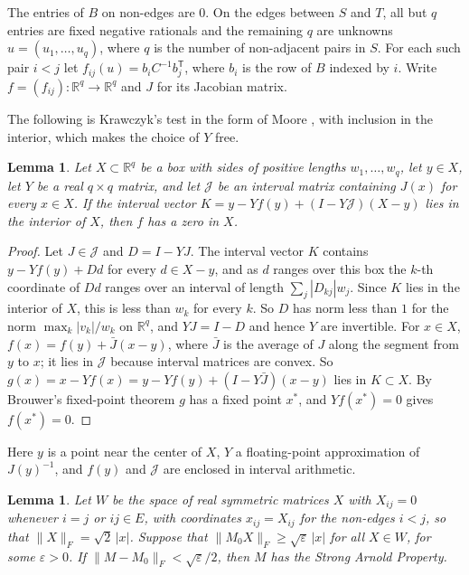 \documentclass[11pt]{article}
\newtheorem{lemma}[theorem]{Lemma}
\theoremstyle{remark}
\begin{document}
The entries of $B$ on non-edges are $0$. On the edges between $S$ and
$T$, all but $q$ entries are fixed negative rationals and the remaining
$q$ are unknowns $u=(u_1,\dots,u_q)$, where $q$ is the number of
non-adjacent pairs in $S$. For each such pair $i<j$ let
$f_{ij}(u)=b_iC^{-1}b_j^{\mathsf T}$, where $b_i$ is the row of $B$
indexed by $i$. Write $f=(f_{ij})\colon\mathbb{R}^q\to\mathbb{R}^q$ and
$J$ for its Jacobian matrix.

The following is Krawczyk's test \cite{Kr} in the form of Moore
\cite{Mo}, with inclusion in the interior, which makes the choice of $Y$
free.

\begin{lemma}\label{lem:krawczyk}
Let $X\subset\mathbb{R}^q$ be a box with sides of positive lengths
$w_1,\dots,w_q$, let $y\in X$, let $Y$ be a real $q\times q$ matrix, and
let $\mathcal{J}$ be an interval matrix containing $J(x)$ for every $x\in
X$. If the interval vector $K=y-Yf(y)+(I-Y\mathcal{J})(X-y)$ lies in the
interior of $X$, then $f$ has a zero in $X$.
\end{lemma}

\begin{proof}
Let $J\in\mathcal{J}$ and $D=I-YJ$. The interval vector $K$ contains
$y-Yf(y)+Dd$ for every $d\in X-y$, and as $d$ ranges over this box the
$k$-th coordinate of $Dd$ ranges over an interval of length
$\sum_j|D_{kj}|w_j$. Since $K$ lies in the interior of $X$, this is less
than $w_k$ for every $k$. So $D$ has norm less than $1$ for the norm
$\max_k|v_k|/w_k$ on $\mathbb{R}^q$, and $YJ=I-D$ and hence $Y$ are
invertible. For $x\in X$, $f(x)=f(y)+\bar J(x-y)$, where $\bar J$
is the average of $J$ along the segment from $y$ to $x$; it lies in
$\mathcal{J}$ because interval matrices are convex. So
$g(x)=x-Yf(x)=y-Yf(y)+(I-Y\bar J)(x-y)$ lies in $K\subset X$. By Brouwer's
fixed-point theorem $g$ has a fixed point $x^*$, and $Yf(x^*)=0$ gives
$f(x^*)=0$.
\end{proof}

Here $y$ is a point near the center of $X$, $Y$ a floating-point
approximation of $J(y)^{-1}$, and $f(y)$ and $\mathcal{J}$
are enclosed in interval arithmetic.

\begin{lemma}\label{lem:sap}
Let $W$ be the space of real symmetric matrices $X$ with $X_{ij}=0$
whenever $i=j$ or $ij\in E$, with coordinates $x_{ij}=X_{ij}$ for the
non-edges $i<j$, so that $\|X\|_F=\sqrt2\,|x|$. Suppose that
$\|M_0X\|_F\ge\sqrt{\varepsilon}\,|x|$ for all $X\in W$, for some
$\varepsilon>0$. If $\|M-M_0\|_F<\sqrt{\varepsilon}/2$, then $M$ has the
Strong Arnold Property.
\end{lemma}
\end{document}
